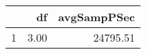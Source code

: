 \begin{table}[h]
\centering
\begin{tabular}{rrr}
  \hline
 & df & avgSampPSec \\ 
  \hline
1 & 3.00 & 24795.51 \\ 
   \hline
\end{tabular}
\end{table}
